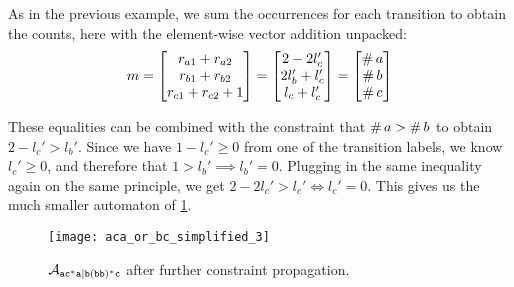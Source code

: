 \documentclass[acmsmall,review,anonymous,screen]{acmart}\settopmatter{printfolios=true,printccs=false,printacmref=true}
\theoremstyle{definition}
\begin{document}
  As in the previous example, we sum the occurrences for each transition to
  obtain the counts, here with the element-wise vector addition unpacked:
  \[
m =   \begin{bmatrix}
  r_{a1} + r_{a2} \\
  r_{b1} + r_{b2} \\
  r_{c1} + r_{c2} + 1 \\
  \end{bmatrix} =
  \begin{bmatrix}
    2 -2l_c' \\
    2l_b' + l_c' \\
    l_c + l_c' \\
    \end{bmatrix} =
    \begin{bmatrix}
      \operatorname{\#}{a} \\
      \operatorname{\#}{b} \\
      \operatorname{\#}{c}
      \end{bmatrix}
  \]
  
These equalities can be combined with the constraint that $\operatorname{\#}{a} >
\operatorname{\#}{b}$ to obtain $2 - l_c' > l_b'$. Since we have $1-l_c' \geq 0$
from one of the transition labels, we know $l_c' \geq 0$, and therefore that $1
> l_b' \implies l_b' = 0$. Plugging in the same inequality again on the same
principle, we get $2 - 2l_c' > l_c' \iff l_c' = 0$. This gives us the much
smaller automaton of \cref{fig:example-simplify-3}.



  \begin{figure}[t]
    \centering 
      \texttt{[image: aca\_or\_bc\_simplified\_3]}
      \caption{$\mathcal{A}_{\mathtt{ac^*a|b(bb)^*c}}{}$ after further constraint propagation.}\label{fig:example-simplify-3}
    \end{figure}
\end{document}
